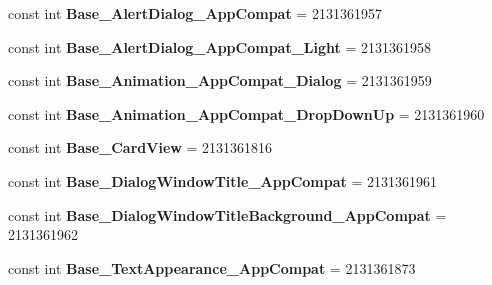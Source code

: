 \begin{DoxyCompactItemize}
\item 
\mbox{\label{class_sample_app_1_1_droid_1_1_resource_1_1_style_a42878966e5af0f82ede2a2b75553b18a}} 
const int {\bfseries Base\+\_\+\+Alert\+Dialog\+\_\+\+App\+Compat} = 2131361957
\item 
\mbox{\label{class_sample_app_1_1_droid_1_1_resource_1_1_style_abb7681531e233680ac5048bed5be9347}} 
const int {\bfseries Base\+\_\+\+Alert\+Dialog\+\_\+\+App\+Compat\+\_\+\+Light} = 2131361958
\item 
\mbox{\label{class_sample_app_1_1_droid_1_1_resource_1_1_style_a13fe239c60684be0202715994b0ee30f}} 
const int {\bfseries Base\+\_\+\+Animation\+\_\+\+App\+Compat\+\_\+\+Dialog} = 2131361959
\item 
\mbox{\label{class_sample_app_1_1_droid_1_1_resource_1_1_style_a06c0ac2530bea37577b93a95468d615c}} 
const int {\bfseries Base\+\_\+\+Animation\+\_\+\+App\+Compat\+\_\+\+Drop\+Down\+Up} = 2131361960
\item 
\mbox{\label{class_sample_app_1_1_droid_1_1_resource_1_1_style_a949b3d117dac29028b1080491739cd77}} 
const int {\bfseries Base\+\_\+\+Card\+View} = 2131361816
\item 
\mbox{\label{class_sample_app_1_1_droid_1_1_resource_1_1_style_a513d44a988c5c902da80317b77eb2616}} 
const int {\bfseries Base\+\_\+\+Dialog\+Window\+Title\+\_\+\+App\+Compat} = 2131361961
\item 
\mbox{\label{class_sample_app_1_1_droid_1_1_resource_1_1_style_aebc9d55c50f81f7f92dd3601fe3c0a85}} 
const int {\bfseries Base\+\_\+\+Dialog\+Window\+Title\+Background\+\_\+\+App\+Compat} = 2131361962
\item 
\mbox{\label{class_sample_app_1_1_droid_1_1_resource_1_1_style_ad46866324e1dd2567dc7ac587b913528}} 
const int {\bfseries Base\+\_\+\+Text\+Appearance\+\_\+\+App\+Compat} = 2131361873

\end{DoxyCompactItemize}
